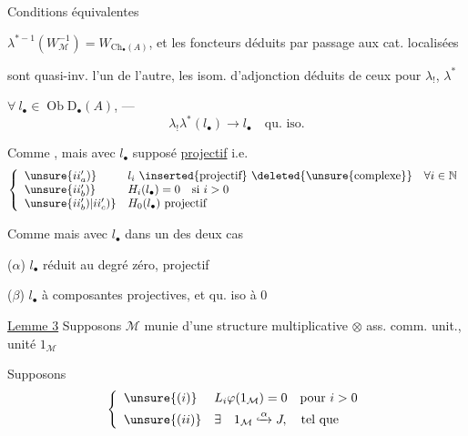 Conditions équivalentes

 
$\lambda^{*-1}(W_{\mathcal M}^{-1})=W_{\mathrm{Ch}_\bullet(A)}$,
et les foncteurs déduits par passage aux cat. localisées


sont quasi-inv. l'un de l'autre, les isom. d'adjonction déduits de ceux pour $\lambda_!$, $\lambda^*$

 $\forall\ l_\bullet\in\operatorname{Ob}\mathrm D_\bullet(A)$, ---
\[
\lambda_!\lambda^*(l_\bullet)\longrightarrow l_\bullet\quad\text{qu. iso.}
\]

 Comme , mais avec $l_\bullet$ supposé \uline{projectif}
i.e.
\[
\left\{\begin{array}{ll}
\unsure{ii'_a)}&l_i\text{ \inserted{projectif}}\ \deleted{\unsure{\text{complexe}}}\quad\forall i\in\mathbb N\\
\unsure{ii'_b)}&H_i(l_\bullet)=0\quad\text{si }i>0\\
\unsure{ii'_b)|ii'_c)}&H_0(l_\bullet)\text{ projectif}
\end{array}\right.
\]

 Comme  mais avec $l_\bullet$ dans un des deux cas

($\alpha$) $l_\bullet$ réduit au degré zéro, projectif

($\beta$) $l_\bullet$ à composantes projectives,
 et qu. iso à $0$

\uline{Lemme 3} Supposons $\mathcal M$ 
munie d'une structure multiplicative $\otimes$ 
ass. comm. unit.,  unité $1_{\mathcal M}$

Supposons
\[
\left\{\begin{array}{ll}
\unsure{(i)}&L_i\varphi(1_{\mathcal M})=0\quad\text{pour }i>0\\[4pt]
\unsure{(ii)}&\exists\quad 1_{\mathcal M}\lhook\joinrel\xrightarrow{\alpha}J,
\quad\text{tel que}
\end{array}\right.
\]

